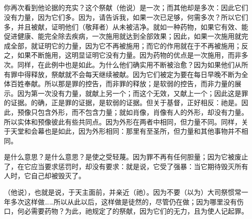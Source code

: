 \subsection{}

\par

你再次看到他论据的充实？这个祭献（他说）是一次；而其他却是多次：因此它们没有力量，因为它们多。因为，请告诉我，如果一次已足够，何需多次？所以它们多，并且被献，证明他们（敬拜者）从未被洁净。就如一种药物，如果它有效、能促进健康、能完全除去疾病，一次施用就达到全部效果；因此，如果一次施用就完成全部，就证明它的力量，因为它不再被施用；而它的作用就在于不再被施用；反之，如果不断施用，这明显证明它没有力量。因为药物的优点是一次施用，而非多次。同样，在此例中也是如此。为什么他们确实用不断被治愈？因为如果他们从所有罪中得释放，祭献就不会每天继续被献。因为它们被定为要在每日早晚不断为全体百姓奉献。所以那是罪的控告，而非罪的释放；是软弱的控告，而非力量的展示。因为第一次没有力量，就献上另一个；而这个无效，又献上一个；因此这是罪的证据。的确，正是罪的证据，是软弱的证据。但关于基督，正好相反：祂是。因此，预像只包含外形，而不包含力量；就如肖像，肖像有人的外形，却没有力量。所以实体和预像彼此有些共同点。因为外形在两者中相同，但力量不同。同样，关于天堂和会幕也是如此，因为外形相同：那里有至圣所，但力量和其他事物并不相同。\par

是什么意思？是什么意思？是使之受轻蔑。因为罪不再有任何胆量；因为它被废止了，在它应当要求惩罚时，却没有要求：就是说，它受了强暴：当它期待毁灭所有人时，它自己却被毁灭了。\par

（他说），也就是说，于天主面前，并亲近（祂）。因为不要（以为）大司祭惯常一年多次这样做……所以从此以后，这样做是徒然的，尽管仍在做；因为哪里没有伤口，何必需要药物？为此，祂规定了的祭献，因为它们的无力，且为使人记起罪。\par

